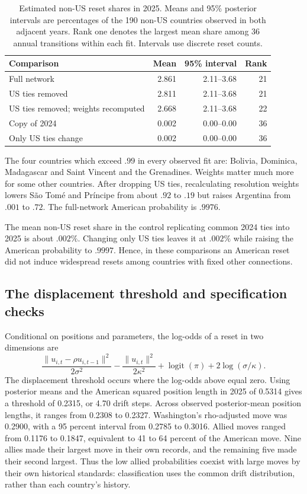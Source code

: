 \documentclass[10pt,authoryear]{elsarticle}
\begin{document}
\begin{table}[ht]
\centering\small
\caption{Estimated non-US reset shares in 2025. Means and 95\% posterior intervals are percentages of the 190 non-US countries observed in both adjacent years. Rank one denotes the largest mean share among 36 annual transitions within each fit. Intervals use discrete reset counts.}
\label{tab:final_non_us_comparison}
\begin{tabularx}{\textwidth}{>{\raggedright\arraybackslash}X r r r}\toprule
Comparison & Mean & 95\% interval & Rank\\\midrule
Full network & 2.861 & 2.11--3.68 & 21\\
US ties removed & 2.811 & 2.11--3.68 & 21\\
US ties removed; weights recomputed & 2.668 & 2.11--3.68 & 22\\
Copy of 2024 & 0.002 & 0.00--0.00 & 36\\
Only US ties change & 0.002 & 0.00--0.00 & 36\\
\bottomrule
\end{tabularx}
\end{table}

The four countries which exceed $.99$ in every observed fit are: Bolivia, Dominica, Madagascar and Saint Vincent and the Grenadines. Weights matter much more for some other countries. After dropping US ties, recalculating resolution weights lowers S\~ao Tom\'e and Pr\'incipe from about $.92$ to $.19$ but raises Argentina from $.001$ to $.72$. The full-network American probability is $.9976$.

The mean non-US reset share in the control replicating common 2024 ties into 2025 is about $.002\%$. Changing only US ties leaves it at $.002\%$ while raising the American probability to $.9997$. Hence, in these comparisons an American reset did not induce widespread resets among countries with fixed other connections.

\subsection{The displacement threshold and specification checks}

Conditional on positions and parameters, the log-odds of a reset in two dimensions are
\[
\frac{\|u_{i,t}-\rho u_{i,t-1}\|^2}{2\sigma^2}
-\frac{\|u_{i,t}\|^2}{2\kappa^2}+\operatorname{logit}(\pi)+2\log(\sigma/\kappa).
\]
The displacement threshold occurs where the log-odds above equal zero. Using posterior means and the American squared position length in 2025 of 0.5314 gives a threshold of 0.2315, or 4.70 drift steps. Across observed posterior-mean position lengths, it ranges from 0.2308 to 0.2327. Washington's rho-adjusted move was 0.2900, with a 95 percent interval from 0.2785 to 0.3016. Allied moves ranged from 0.1176 to 0.1847, equivalent to 41 to 64 percent of the American move. Nine allies made their largest move in their own records, and the remaining five made their second largest. Thus the low allied probabilities coexist with large moves by their own historical standards: classification uses the common drift distribution, rather than each country's history.
\end{document}
